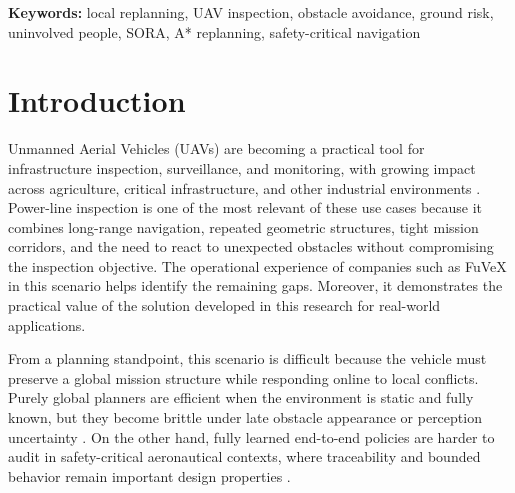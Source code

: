 \documentclass[a4paper,11pt]{article}
\begin{document}
\noindent\textbf{Keywords:} local replanning, UAV inspection, obstacle avoidance, ground risk, uninvolved people, SORA, A* replanning, safety-critical navigation

\section{Introduction}

Unmanned Aerial Vehicles (UAVs) are becoming a practical tool for infrastructure inspection, surveillance, and monitoring, with growing impact across agriculture, critical infrastructure, and other industrial environments \cite{imran2025environmental,marut2024surveillance}. Power-line inspection is one of the most relevant of these use cases because it combines long-range navigation, repeated geometric structures, tight mission corridors, and the need to react to unexpected obstacles without compromising the inspection objective. The operational experience of companies such as FuVeX in this scenario helps identify the remaining gaps. Moreover, it demonstrates the practical value of the solution developed in this research for real-world applications.  %

From a planning standpoint, this scenario is difficult because the vehicle must preserve a global mission structure while responding online to local conflicts. Purely global planners are efficient when the environment is static and fully known, but they become brittle under late obstacle appearance or perception uncertainty \cite{debnath2024review,meng2025advances}. On the other hand, fully learned end-to-end policies are harder to audit in safety-critical aeronautical contexts, where traceability and bounded behavior remain important design properties \cite{EASA_AI_Roadmap_2.0}.
\end{document}
